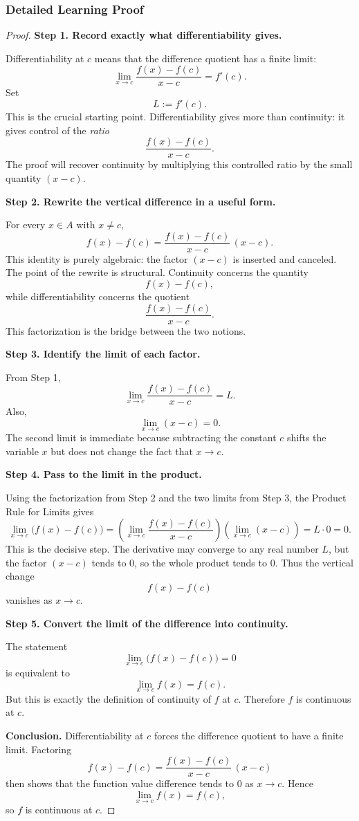 \subsubsection*{Detailed Learning Proof}

\begin{proof}
\textbf{Step 1. Record exactly what differentiability gives.}

Differentiability at $c$ means that the difference quotient has a finite limit:
\[
\lim_{x \to c} \frac{f(x)-f(c)}{x-c}=f'(c).
\]
Set
\[
L:=f'(c).
\]
This is the crucial starting point. Differentiability gives more than continuity: it gives control of the \emph{ratio}
\[
\frac{f(x)-f(c)}{x-c}.
\]
The proof will recover continuity by multiplying this controlled ratio by the small quantity $(x-c)$.

\medskip

\textbf{Step 2. Rewrite the vertical difference in a useful form.}

For every $x \in A$ with $x \neq c$,
\[
f(x)-f(c)=\frac{f(x)-f(c)}{x-c}\,(x-c).
\]
This identity is purely algebraic: the factor $(x-c)$ is inserted and canceled. The point of the rewrite is structural. Continuity concerns the quantity
\[
f(x)-f(c),
\]
while differentiability concerns the quotient
\[
\frac{f(x)-f(c)}{x-c}.
\]
This factorization is the bridge between the two notions.

\medskip

\textbf{Step 3. Identify the limit of each factor.}

From Step 1,
\[
\lim_{x \to c} \frac{f(x)-f(c)}{x-c}=L.
\]
Also,
\[
\lim_{x \to c} (x-c)=0.
\]
The second limit is immediate because subtracting the constant $c$ shifts the variable $x$ but does not change the fact that $x \to c$.

\medskip

\textbf{Step 4. Pass to the limit in the product.}

Using the factorization from Step 2 and the two limits from Step 3, the Product Rule for Limits gives
\[
\lim_{x \to c} \bigl(f(x)-f(c)\bigr)
=
\left(\lim_{x \to c} \frac{f(x)-f(c)}{x-c}\right)
\left(\lim_{x \to c} (x-c)\right)
=
L \cdot 0
=
0.
\]
This is the decisive step. The derivative may converge to any real number $L$, but the factor $(x-c)$ tends to $0$, so the whole product tends to $0$. Thus the vertical change
\[
f(x)-f(c)
\]
vanishes as $x \to c$.

\medskip

\textbf{Step 5. Convert the limit of the difference into continuity.}

The statement
\[
\lim_{x \to c} \bigl(f(x)-f(c)\bigr)=0
\]
is equivalent to
\[
\lim_{x \to c} f(x)=f(c).
\]
But this is exactly the definition of continuity of $f$ at $c$. Therefore $f$ is continuous at $c$.

\medskip

\textbf{Conclusion.}
Differentiability at $c$ forces the difference quotient to have a finite limit. Factoring
\[
f(x)-f(c)
=
\frac{f(x)-f(c)}{x-c}\,(x-c)
\]
then shows that the function value difference tends to $0$ as $x \to c$. Hence
\[
\lim_{x \to c} f(x)=f(c),
\]
so $f$ is continuous at $c$.
\end{proof}

